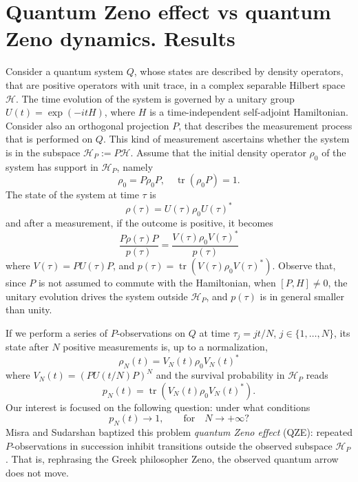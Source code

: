 \documentclass[aip,jmp
]{revtex4}
\newcommand{\tr}{\mathop{\mathrm{tr}}\nolimits}
\theoremstyle{definition}
\begin{document}
\section{\label{sec:results}Quantum Zeno effect vs quantum Zeno dynamics. Results}


Consider a quantum system $Q$, whose states are described by density operators, that are positive operators with unit trace, in a complex separable Hilbert space
$\mathcal{H}$.
The time evolution of the system is governed by a unitary group
$U(t)=\exp(-itH)$, where $H$ is a time-independent self-adjoint Hamiltonian.
Consider also an orthogonal projection $P$, that describes the
measurement process that is performed on $Q$.
This kind of measurement ascertains whether the system is in the
subspace $\mathcal{H}_{P}:=P\mathcal{H}$.
Assume that the initial
density operator $\rho_{0}$
of the system has support in $\mathcal{H}_{P}$, namely
\begin{equation*}
\rho_{0}=P\rho_{0}P, \quad \tr(\rho_{0}P)=1.
\end{equation*}
The state of the system at time $\tau$ is
\begin{equation*}
\rho(\tau)=U(\tau)\rho_{0}U(\tau)^{*}
\end{equation*}
and after a measurement, if the outcome is positive, it becomes
\[
\frac{P\rho(\tau)P}{p(\tau)}=\frac{V(\tau)\rho_{0}V(\tau)^{*}}{p(\tau)}
\]
where $V(\tau)=PU(\tau)P$, and $p(\tau)=
\tr(V(\tau)\rho_{0}V(\tau)^{*})$. Observe that, since $P$ is not
assumed to commute with the Hamiltonian, when $[P,H]\neq 0$, the
unitary evolution drives the system outside $\mathcal{H}_{P}$, and
$p(\tau)$ is in general smaller than unity.

If we perform a series of $P$-observations on $Q$ at time
$\tau_{j}=jt/N$, $j \in \{1, \ldots, N\}$, its state after $N$
positive measurements is, up to a normalization,
\[
\rho_{N}(t)=V_{N}(t)\rho_{0}V_{N}(t)^{*}
\]
where $V_{N}(t)=(PU(t/N)P)^N$ and the survival probability in
$\mathcal{H}_{P}$ reads
\begin{equation}
\label{eq:pN(t)}
p_{N}(t)= \tr (V_{N}(t)\rho_{0}V_{N}(t)^{*}).
\end{equation}
Our interest is focused on the following question: under what
conditions
\begin{equation}
p_{N}(t) \to 1, \qquad \text{for} \quad N \to +\infty?
\label{eq:QZEdef}
\end{equation}
Misra and Sudarshan \cite{misra}  baptized this problem \emph{quantum Zeno effect} (QZE): repeated $P$-observations in succession inhibit transitions
outside the observed subspace $\mathcal{H}_{P}$. That is, rephrasing the Greek philosopher Zeno, the observed quantum arrow does not move.
\end{document}
